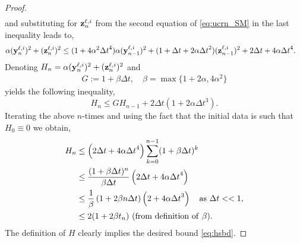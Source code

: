 \documentclass{article}
\newcommand{\Dt}{{\Delta t}}
\newcommand{\byli}{{\bf y}^{\ell,i}}
\newcommand{\bzli}{{\bf z}^{\ell,i}}
\begin{document}
\begin{proof}
\begin{align*}
\end{align*}
and substituting for $\bzli_n$ from the second equation of \eqref{eq:ucrn_SM} in the last inequality leads to,
\begin{align*}
 \alpha (\byli_n)^2 +  (\bzli_n)^2     &\leq (1+4\alpha^2\Dt^4) \alpha (\byli_{n-1})^2 +  (1+\Dt + 2 \alpha \Dt^2)(\bzli_{n-1})^2 + 2\Dt + 4\alpha \Dt^4.
\end{align*}
Denoting $H_n = \alpha (\byli_n)^2 +  (\bzli_n)^2 $ and 
\begin{align*}
    G := 1 + \beta\Dt, \quad \beta=\max\{1+2\alpha,4\alpha^2\}
\end{align*}
yields the following inequality,
\begin{equation}
    \label{eq:pf33}
    H_n \leq GH_{n-1} +  2\Dt(1 + 2\alpha \Dt^3).
\end{equation}
Iterating the above $n$-times and using the fact that the initial data is such that $H_0 \equiv 0$ we obtain,
\begin{equation}
    \label{eq:pf35}
    \begin{aligned}
    H_n &\leq \left(2\Dt + 4\alpha \Dt^4\right) \sum_{k=0}^{n-1} (1+\beta \Dt)^{k} 
    \\&\leq 
    \frac{(1+\beta \Dt)^n}{\beta \Dt} \left(2\Dt + 4\alpha \Dt^4\right) \\
    &\leq \frac{1}{\beta}\left(1+2\beta n \Dt\right)\left(2 + 4\alpha \Dt^3\right) \quad {\rm as}~\Dt << 1, \\
    &\leq 2(1+2\beta t_n) ~({\rm from~definition~of~}\beta).
    \end{aligned}
\end{equation}
The definition of $H$ clearly implies the desired bound \eqref{eq:hsbd}.
\end{proof}
\end{document}
